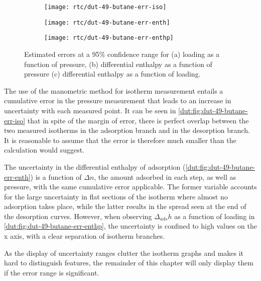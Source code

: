 \begin{figure}[htb]
    \centering
    \begin{subfigure}{0.33\linewidth}
        \texttt{[image: rtc/dut-49-butane-err-iso]}%
        \caption{}\label{dut:fig:dut-49-butane-err-iso}
    \end{subfigure}%
    \begin{subfigure}{0.33\linewidth}
        \texttt{[image: rtc/dut-49-butane-err-enth]}%
        \caption{}\label{dut:fig:dut-49-butane-err-enth}
    \end{subfigure}%
    \begin{subfigure}{0.33\linewidth}
        \texttt{[image: rtc/dut-49-butane-err-enthp]}%
        \caption{}\label{dut:fig:dut-49-butane-err-enthp}
    \end{subfigure}%
    \caption{Estimated errors at a 95\% confidence range for 
    (a) loading as a function of pressure, 
    (b) differential enthalpy as a function of pressure 
    (c) differential enthalpy as a function of loading.}%
    \label{dut:fig:dut-49-butane-err}
\end{figure}

The use of the manometric method for isotherm measurement entails a 
cumulative error in the pressure measurement that leads to an increase
in uncertainty with each measured point. It can be seen in 
\autoref{dut:fig:dut-49-butane-err-iso} that in spite of the margin of 
error, there is perfect overlap between the two measured isotherms
in the adsorption branch and in the desorption branch. It is reasonable
to assume that the error is therefore much smaller than the calculation 
would suggest.

The uncertainty in the differential enthalpy of adsorption 
(\autoref{dut:fig:dut-49-butane-err-enth}) is a 
function of \(\Delta n\), the amount adsorbed in each step, as well
as pressure, with the same cumulative error applicable. The former 
variable accounts for the large uncertainty in flat sections of 
the isotherm where almost no adsorption takes place, while the latter
results in the spread seen at the end of the desorption curves. 
However, when observing \(\Delta_{ads} \dot{h}\) as a function of 
loading in \autoref{dut:fig:dut-49-butane-err-enthp}, the uncertainty 
is confined to high values on the x axis, with a clear separation
of isotherm branches.

As the display of uncertainty ranges clutter the isotherm graphs and 
makes it hard to distinguish features, the remainder of this chapter 
will only display them if the error range is significant.